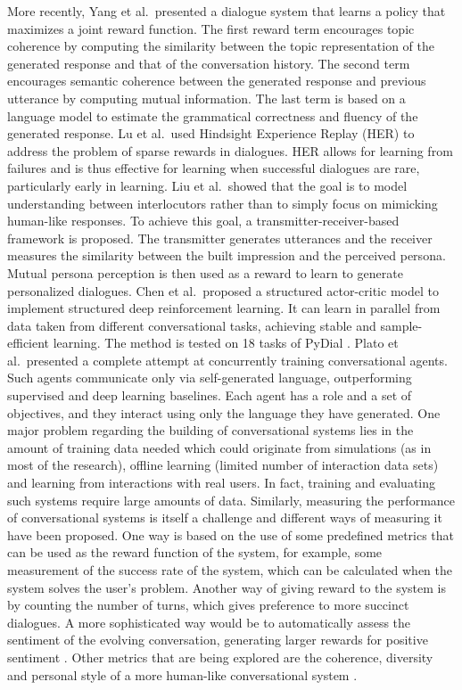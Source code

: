 More recently, Yang et al.\  presented a dialogue system that learns a policy that maximizes a joint reward function. The first reward term encourages topic coherence by computing the similarity between the topic representation of the generated response and that of the conversation history. The second term encourages semantic coherence between the generated response and previous utterance by computing mutual information. The last term is based on a language model to estimate the grammatical correctness and fluency of the generated response. Lu et al.\  used Hindsight Experience Replay (HER) to address the problem of sparse rewards in dialogues. HER allows for learning from failures and is thus effective for learning when successful dialogues are rare, particularly early in learning. Liu et al.\  showed that the goal is to model understanding between interlocutors rather than to simply focus on mimicking human-like responses. To achieve this goal, a transmitter-receiver-based framework is proposed. The transmitter generates utterances and the receiver measures the similarity between the built impression and the perceived persona. Mutual persona perception is then used as a reward to learn to generate personalized dialogues. Chen et al.\  proposed a structured actor-critic model to implement structured deep reinforcement learning. It can learn in parallel from data taken from different conversational tasks,  achieving stable and sample-efficient learning. The method is tested on 18 tasks of PyDial . Plato et al.\  presented a complete attempt at concurrently training conversational agents. Such agents communicate only via self-generated language, outperforming supervised and deep learning baselines. Each agent has a role and a set of objectives, and they interact using only the language they have generated.
One major problem regarding the building of conversational systems lies in the amount of training data needed  which could originate from simulations (as in most of the research), offline learning (limited number of interaction data sets) and learning from interactions with real users. In fact, training and evaluating such systems require large amounts of data. Similarly, measuring the performance of conversational systems is itself a challenge and different ways of measuring it have been proposed. One way is based on the use of some predefined metrics that can be used as the reward function of the system, for example, some measurement of the success rate of the system, which can be calculated when the system solves the user's problem. Another way of giving reward to the system is by counting the number of turns, which gives preference to more succinct dialogues. A more sophisticated way would be to automatically assess the sentiment of the evolving conversation, generating larger rewards for positive sentiment . Other metrics that are being explored are the coherence, diversity and personal style of a more human-like conversational system .
